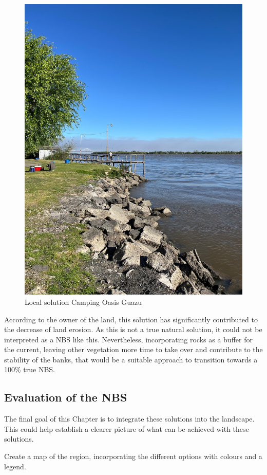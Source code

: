 \begin{figure}[H]
    \centering
    \includegraphics[width=0.5\linewidth]{figures/appendixE/rocks.jpg}
    \caption{Local solution Camping Oasis Guazu}
    \label{fig:local solution Camping Oasis Guazu}
\end{figure}

According to the owner of the land, this solution has significantly contributed to the decrease of land erosion. As this is not a true natural solution, it could not be interpreted as a NBS like this. Nevertheless, incorporating rocks as a buffer for the current, leaving other vegetation more time to take over and contribute to the stability of the banks, that would be a suitable approach to transition towards a 100\% true NBS.






\subsection{Evaluation of the NBS}

The final goal of this Chapter is to integrate these solutions into the landscape. This could help establish a clearer picture of what can be achieved with these solutions.

Create a map of the region, incorporating the different options with colours and a legend.


